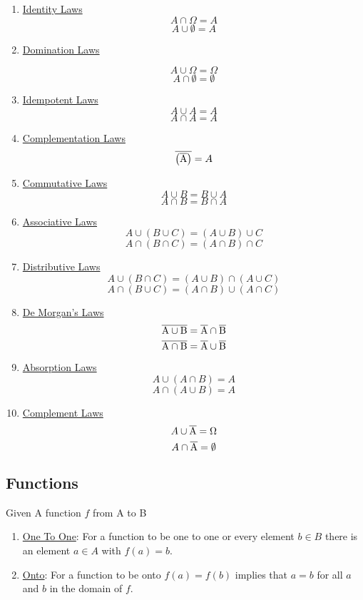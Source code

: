 \documentclass[12pt]{article}
\begin{document}
\begin{enumerate}
\item \underline{Identity Laws}
\[
	A \cap \Omega = A
\]
\[
	A \cup \emptyset = A
\]
\item \underline{Domination Laws}

\[
	A \cup \Omega = \Omega
\]
\[
	A \cap \emptyset = \emptyset
\]
\item \underline{Idempotent Laws}
\[
	A \cup A = A
\]
\[
	A \cap A = A
\]
\item \underline{Complementation Laws}
\[
	\overline{\left ( \overline{\rm A} \right ) } = A
\]
\item \underline{Commutative Laws}
\[
	A \cup B = B \cup A
\]
\[
	A \cap B = B \cap A
\]
\item \underline{Associative Laws}
\[
	A \cup \left ( B \cup C \right ) =  \left ( A \cup B \right ) \cup C 
\]
\[
	A \cap \left ( B \cap C \right ) =  \left ( A \cap B \right ) \cap C 
\]
\item \underline{Distributive Laws}
\[
	A \cup \left ( B \cap C \right ) =  \left ( A \cup B \right ) \cap \left ( A \cup C \right )
\]
\[
	A \cap \left ( B \cup C \right ) =  \left ( A \cap B \right ) \cup \left ( A \cap C \right )
\]
\item \underline{De Morgan's Laws}
\[
	\overline{\rm A \cup B} = \overline{\rm A} \cap \overline{\rm B}
\]
\[
	\overline{\rm A \cap B} = \overline{\rm A} \cup \overline{\rm B}
\]
\item \underline{Absorption Laws}
\[
	A \cup \left ( A \cap B \right ) = A
\]
\[
	A \cap \left ( A \cup B \right ) = A
\]
\item \underline{Complement Laws}
\[
	A \cup \overline{\rm A} = \Omega
\]
\[
	A \cap \overline{\rm A} = \emptyset
\]
\end{enumerate}

\subsection{Functions}

Given A function $f$ from A to B
\begin{enumerate}

\item \underline{One To One}: For a function to be one to one or every element $b \in B$ there is an element $a \in A$ with $f(a)=b$.

\item \underline{Onto}: For a function to be onto $f(a) = f (b)$ implies that $a = b$ for all $a$ and $b$ in the domain of $f$.

\end{enumerate}
\end{document}
